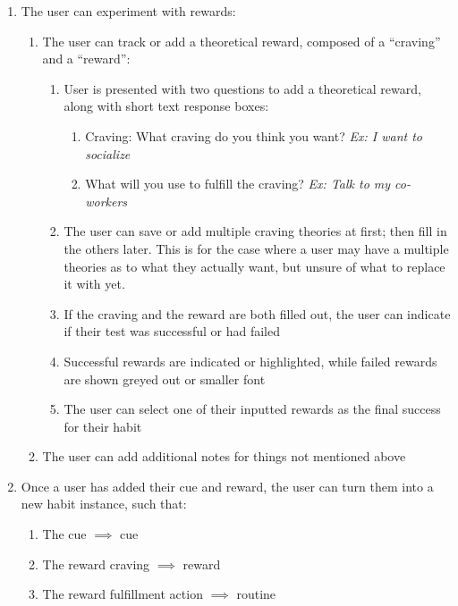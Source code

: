 \begin{enumerate}
\begin{enumerate}
            \end{enumerate}
        \item The user can experiment with rewards:
        \begin{enumerate}
            \item The user can track or add a theoretical reward, composed of a “craving” and a “reward”:
            \begin{enumerate}
                \item User is presented with two questions to add a theoretical reward, along with short text response boxes:
                \begin{enumerate}
                    \item Craving: What craving do you think you want? \textit{Ex: I want to socialize}
                    \item What will you use to fulfill the craving? \textit{Ex: Talk to my co-workers}
                \end{enumerate}
                \item The user can save or add multiple craving theories at first; then fill in the others later. This is for the case where a user may have a multiple theories as to what they actually want, but unsure of what to replace it with yet.
                \item If the craving and the reward are both filled out, the user can indicate if their test was successful or had failed
                \item Successful rewards are indicated or highlighted, while failed rewards are shown greyed out or smaller font
                \item The user can select one of their inputted rewards as the final success for their habit
            \end{enumerate}
            \item The user can add additional notes for things not mentioned above
        \end{enumerate}
        \item Once a user has added their cue and reward, the user can turn them into a new habit instance, such that:
        \begin{enumerate}
            \item The cue $\implies$ cue
            \item The reward craving $\implies$ reward
            \item The reward fulfillment action $\implies$ routine
        \end{enumerate}

\end{enumerate}
